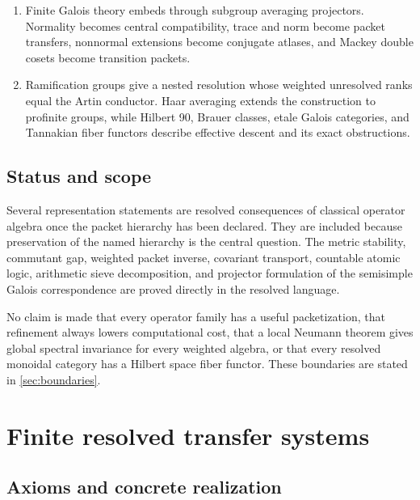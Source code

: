 \documentclass{aomart}
\theoremstyle{definition}
\theoremstyle{remark}
\begin{document}
\begin{enumerate}
\item Finite Galois theory embeds through subgroup averaging projectors. Normality becomes central compatibility, trace and norm become packet transfers, nonnormal extensions become conjugate atlases, and Mackey double cosets become transition packets.
\item Ramification groups give a nested resolution whose weighted unresolved ranks equal the Artin conductor. Haar averaging extends the construction to profinite groups, while Hilbert 90, Brauer classes, etale Galois categories, and Tannakian fiber functors describe effective descent and its exact obstructions.
\end{enumerate}

\subsection{Status and scope}

Several representation statements are resolved consequences of classical operator algebra once the packet hierarchy has been declared. They are included because preservation of the named hierarchy is the central question. The metric stability, commutant gap, weighted packet inverse, covariant transport, countable atomic logic, arithmetic sieve decomposition, and projector formulation of the semisimple Galois correspondence are proved directly in the resolved language.

No claim is made that every operator family has a useful packetization, that refinement always lowers computational cost, that a local Neumann theorem gives global spectral invariance for every weighted algebra, or that every resolved monoidal category has a Hilbert space fiber functor. These boundaries are stated in \cref{sec:boundaries}.

\section{Finite resolved transfer systems}\label{sec:finite}

\subsection{Axioms and concrete realization}
\end{document}
